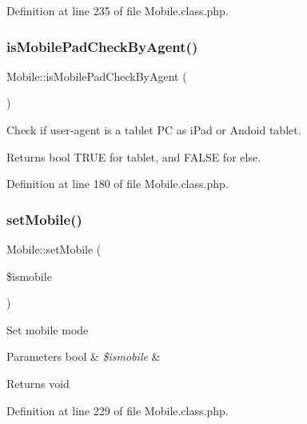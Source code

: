 Definition at line 235 of file Mobile.\+class.\+php.

\mbox{\label{classMobile_a137e8bae3e1f34b018864d2df624113f}} 
\subsubsection{\texorpdfstring{is\+Mobile\+Pad\+Check\+By\+Agent()}{isMobilePadCheckByAgent()}}
{\footnotesize\ttfamily Mobile\+::is\+Mobile\+Pad\+Check\+By\+Agent (\begin{DoxyParamCaption}{ }\end{DoxyParamCaption})}

Check if user-\/agent is a tablet PC as i\+Pad or Andoid tablet.

\begin{DoxyReturn}{Returns}
bool T\+R\+UE for tablet, and F\+A\+L\+SE for else. 
\end{DoxyReturn}


Definition at line 180 of file Mobile.\+class.\+php.

\mbox{\label{classMobile_a82db2bb3415147c24d429bb065542053}} 
\subsubsection{\texorpdfstring{set\+Mobile()}{setMobile()}}
{\footnotesize\ttfamily Mobile\+::set\+Mobile (\begin{DoxyParamCaption}\item[{}]{\$ismobile }\end{DoxyParamCaption})}

Set mobile mode


\begin{DoxyParams}[1]{Parameters}
bool & {\em \$ismobile} & \\
\hline
\end{DoxyParams}
\begin{DoxyReturn}{Returns}
void 
\end{DoxyReturn}


Definition at line 229 of file Mobile.\+class.\+php.



